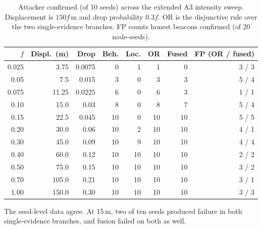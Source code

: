 \begin{table}[!t]
\caption{Attacker confirmed (of 10 seeds) across the extended A3 intensity
sweep. Displacement is $150f$\,m and drop probability $0.3f$. OR is the
disjunctive rule over the two single-evidence branches. FP counts honest
beacons confirmed (of 20 node-seeds).}
\label{tab:sweep}
\centering
\small
\setlength{\tabcolsep}{4pt}
\begin{tabular}{@{}rrrrrrrr@{}}
\hline
$f$ & Displ.\ (m) & Drop & Beh. & Loc. & OR & Fused & FP (OR / fused) \\
\hline
0.025 & 3.75 & 0.0075 & 0 & 1 & 1 & 0 & 3 / 3 \\
0.05 & 7.5 & 0.015 & 3 & 0 & 3 & 3 & 5 / 4 \\
0.075 & 11.25 & 0.0225 & 6 & 0 & 6 & 3 & 1 / 1 \\
0.10 & 15.0 & 0.03 & 8 & 0 & 8 & 7 & 5 / 4 \\
0.15 & 22.5 & 0.045 & 10 & 0 & 10 & 10 & 5 / 5 \\
0.20 & 30.0 & 0.06 & 10 & 2 & 10 & 10 & 4 / 1 \\
0.30 & 45.0 & 0.09 & 10 & 9 & 10 & 10 & 4 / 4 \\
0.40 & 60.0 & 0.12 & 10 & 10 & 10 & 10 & 2 / 2 \\
0.50 & 75.0 & 0.15 & 10 & 10 & 10 & 10 & 3 / 2 \\
0.70 & 105.0 & 0.21 & 10 & 10 & 10 & 10 & 3 / 1 \\
1.00 & 150.0 & 0.30 & 10 & 10 & 10 & 10 & 3 / 3 \\
\hline
\end{tabular}
\end{table}

The seed-level data agree. At 15\,m, two of ten seeds
produced failure in both single-evidence branches, and fusion failed on
both as well.


